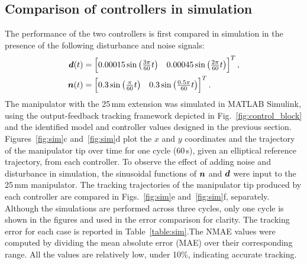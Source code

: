 \subsection{Comparison of controllers in simulation}
The performance of the two controllers is first compared in simulation in the presence of the following disturbance and noise signals:
\begin{align}
\boldsymbol{d}(t)&= \begin{bmatrix} 0.00015\sin\left(\frac{3\pi}{60}t\right) & 0.00045\sin\left(\frac{2\pi}{60} t\right)
\end{bmatrix}^T,\\
\boldsymbol{n}(t)&= \begin{bmatrix} 0.3\sin\left(\frac{\pi}{60}t\right) & 0.3\sin\left(\frac{0.5\pi}{60} t\right)
\end{bmatrix}^T. 
\end{align}
The manipulator with the 25\,mm extension was simulated in MATLAB Simulink, using the output-feedback tracking framework depicted in Fig.~\ref{fig:control_block} and the identified model and controller values designed in the previous section.
Figures~\ref{fig:sim}c and~\ref{fig:sim}d plot the $x$ and $y$ coordinates and the trajectory of the manipulator tip over time for one cycle (60\,s), given an elliptical reference trajectory, from each controller. 
To observe the effect of adding noise and disturbance in simulation, the sinusoidal functions of $\boldsymbol{n}$ and $\boldsymbol{d}$ were input to the 25\,mm manipulator. The tracking trajectories of the manipulator tip produced by each controller are compared in Figs.~\ref{fig:sim}e and~\ref{fig:sim}f, separately. Although the simulations are performed across three cycles, only one cycle is shown in the figures and used in the error comparison for clarity. The tracking error for each case is reported in Table~\ref{table:sim}.The NMAE values were computed by dividing the mean absolute error (MAE) over their corresponding range. All the values are relatively low, under 10\%, indicating accurate tracking. 



